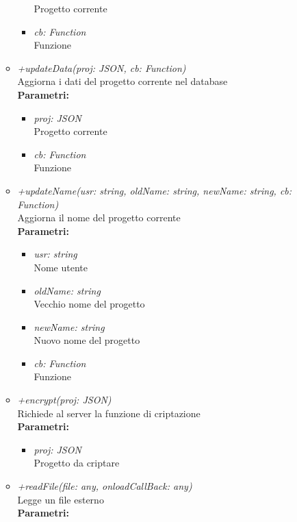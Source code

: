 \begin{itemize}
\begin{itemize}
\begin{itemize}
    			Progetto corrente
    			\item \emph{cb: Function}\\
    			Funzione
    		\end{itemize}
    		\item \emph{+updateData(proj: JSON, cb: Function)}\\
    		Aggiorna i dati del progetto corrente nel database\\
    		\textbf{Parametri:}
    		\begin{itemize}
    			\item \emph{proj: JSON}\\
    			Progetto corrente
    			\item \emph{cb: Function}\\
    			Funzione
    		\end{itemize}
    		\item \emph{+updateName(usr: string, oldName: string, newName: string, cb: Function)}\\
    		Aggiorna il nome del progetto corrente\\
    		\textbf{Parametri:}
    		\begin{itemize}
    			\item \emph{usr: string}\\
    			Nome utente
    			\item \emph{oldName: string}\\
    			Vecchio nome del progetto
    			\item \emph{newName: string}\\
    			Nuovo nome del progetto
    			\item \emph{cb: Function}\\
    			Funzione
    		\end{itemize}
    		\item \emph{+encrypt(proj: JSON)}\\
    		Richiede al server la funzione di criptazione\\
    		\textbf{Parametri:}
    		\begin{itemize}
    			\item \emph{proj: JSON}\\
    			Progetto da criptare
    		\end{itemize}
    		\item \emph{+readFile(file: any, onloadCallBack: any)}\\
    		Legge un file esterno\\
    		\textbf{Parametri:}
    		\begin{itemize}

\end{itemize}
\end{itemize}
\end{itemize}
